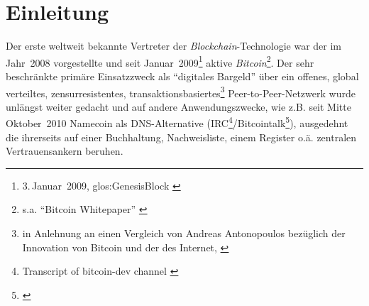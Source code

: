 






\chapter{Einleitung}\label{einleitung}


Der erste weltweit bekannte Vertreter der \emph{Blockchain}-Technologie war der im Jahr~2008 vorgestellte und seit Januar~2009\footnote{3.\,Januar~2009, \gls{glos:GenesisBlock} \autocite{w:bitcoin-wiki}} aktive \emph{Bitcoin}\footnote{s.a. \enquote{Bitcoin Whitepaper} \autocite{p:bitcoin}}.
Der sehr beschränkte primäre Einsatzzweck als \enquote{digitales Bargeld} über ein offenes, global verteiltes, zensurresistentes, transaktionsbasiertes\footnote{in Anlehnung an einen Vergleich von Andreas Antonopoulos bezüglich der Innovation von Bitcoin und der des Internet, \autocite{o:open-blockchain}} Peer-to-Peer-Netzwerk  wurde unlängst weiter gedacht und auf andere Anwendungszwecke, wie z.B. seit Mitte Oktober~2010 Namecoin als DNS-Alternative (IRC\footnote{Transcript of bitcoin-dev channel \autocite{w:irc-ts-bitcoindev}}/Bitcointalk\footnote{\cite{w:bitcointalk-bitdns}}), ausgedehnt die ihrerseits auf einer Buchhaltung, Nachweisliste, einem Register o.ä. zentralen Vertrauensankern beruhen.

